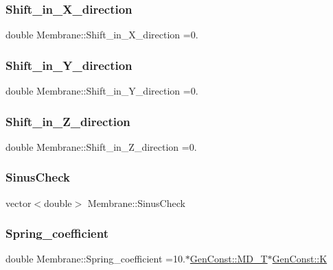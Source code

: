 \subsubsection{\texorpdfstring{Shift\_in\_X\_direction}{Shift\_in\_X\_direction}}
{\footnotesize\ttfamily double Membrane\+::\+Shift\+\_\+in\+\_\+\+X\+\_\+direction =0.}

\mbox{\label{classMembrane_a73b22fb2ebda65accee05510303249ae}} 
\subsubsection{\texorpdfstring{Shift\_in\_Y\_direction}{Shift\_in\_Y\_direction}}
{\footnotesize\ttfamily double Membrane\+::\+Shift\+\_\+in\+\_\+\+Y\+\_\+direction =0.}

\mbox{\label{classMembrane_a2fa88fd7d9832ef58e63b10208a7ccae}} 
\subsubsection{\texorpdfstring{Shift\_in\_Z\_direction}{Shift\_in\_Z\_direction}}
{\footnotesize\ttfamily double Membrane\+::\+Shift\+\_\+in\+\_\+\+Z\+\_\+direction =0.}

\mbox{\label{classMembrane_a593abb7d67c62b99eba2b0d15dcb0c19}} 
\subsubsection{\texorpdfstring{SinusCheck}{SinusCheck}}
{\footnotesize\ttfamily vector$<$double$>$ Membrane\+::\+Sinus\+Check}

\mbox{\label{classMembrane_a51536477e359a874919d08dc7a97c7fa}} 
\subsubsection{\texorpdfstring{Spring\_coefficient}{Spring\_coefficient}}
{\footnotesize\ttfamily double Membrane\+::\+Spring\+\_\+coefficient =10.$\ast$\mbox{\hyperlink{namespaceGenConst_ae4fd28941bbc23f551687bc507c5bde7}{Gen\+Const\+::\+M\+D\+\_\+T}}$\ast$\mbox{\hyperlink{namespaceGenConst_a80679742796064a242391cd8e3c067d0}{Gen\+Const\+::K}}}

